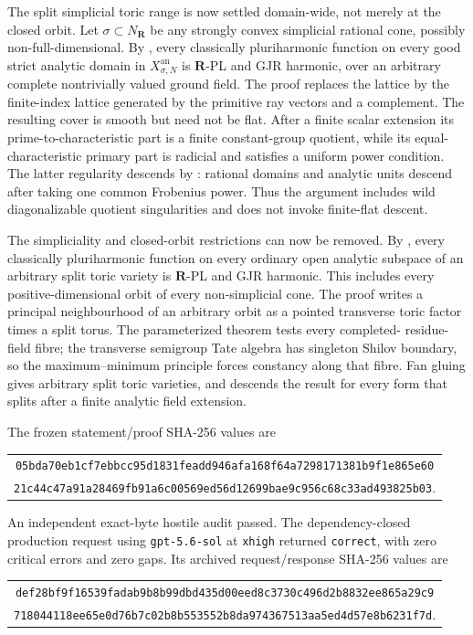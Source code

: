 The split simplicial toric range is now settled domain-wide, not merely at
the closed orbit.  Let \(\sigma\subset N_{\mathbf R}\) be any strongly
convex simplicial rational cone, possibly non-full-dimensional.  By
, every classically pluriharmonic
function on every good strict analytic domain in
\(X_{\sigma,N}^{\mathrm{an}}\) is \(\mathbf R\)-PL and GJR harmonic, over
an arbitrary complete nontrivially valued ground field.  The proof replaces
the lattice by the finite-index lattice generated by the primitive ray
vectors and a complement.  The resulting cover is smooth but need not be
flat.  After a finite scalar extension its prime-to-characteristic part is
a finite constant-group quotient, while its equal-characteristic primary
part is radicial and satisfies a uniform power condition.  The latter
regularity descends by : rational
domains and analytic units descend after taking one common Frobenius power.
Thus the argument includes wild diagonalizable quotient singularities and
does not invoke finite-flat descent.

The simpliciality and closed-orbit restrictions can now be removed.  By
, every classically pluriharmonic
function on every ordinary open analytic subspace of an arbitrary split
toric variety is \(\mathbf R\)-PL and GJR harmonic.  This includes every
positive-dimensional orbit of every non-simplicial cone.  The proof writes a
principal neighbourhood of an arbitrary orbit as a pointed transverse toric
factor times a split torus.  The parameterized theorem
 tests every completed-
residue-field fibre; the transverse semigroup Tate algebra has singleton
Shilov boundary, so the maximum--minimum principle forces constancy along
that fibre.  Fan gluing gives arbitrary split toric varieties, and
 descends the result for every form that splits
after a finite analytic field extension.

The frozen statement/proof SHA-256 values are
\begin{center}
\small
\begin{tabular}{@{}c@{}}
\nolinkurl{05bda70eb1cf7ebbcc95d1831feadd946afa168f64a7298171381b9f1e865e60}\\
\nolinkurl{21c44c47a91a28469fb91a6c00569ed56d12699bae9c956c68c33ad493825b03}.
\end{tabular}
\end{center}
An independent exact-byte hostile audit passed.  The dependency-closed
production request using \texttt{gpt-5.6-sol} at \texttt{xhigh} returned
\texttt{correct}, with zero critical errors and zero gaps.  Its archived
request/response SHA-256 values are
\begin{center}
\small
\begin{tabular}{@{}c@{}}
\nolinkurl{def28bf9f16539fadab9b8b99dbd435d00eed8c3730c496d2b8832ee865a29c9}\\
\nolinkurl{718044118ee65e0d76b7c02b8b553552b8da974367513aa5ed4d57e8b6231f7d}.
\end{tabular}
\end{center}

